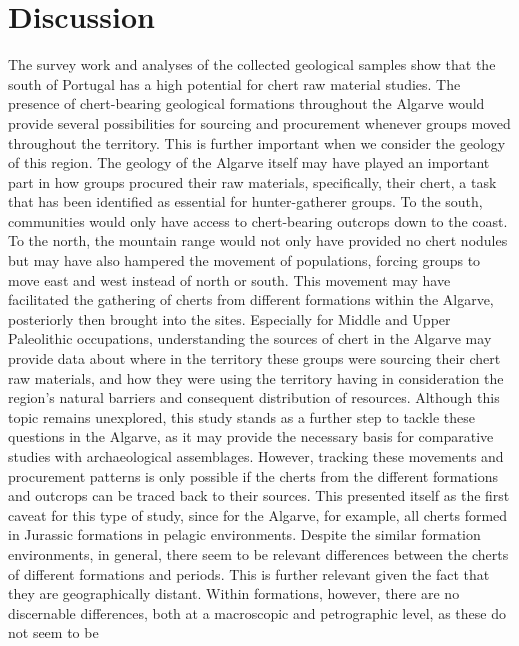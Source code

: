 \documentclass[
  a4paper,
  DIV=11,
  numbers=noendperiod]{scrreprt}
\begin{document}
\section*{Discussion}\label{discussion}


The survey work and analyses of the collected geological samples show
that the south of Portugal has a high potential for chert raw material
studies. The presence of chert-bearing geological formations throughout
the Algarve would provide several possibilities for sourcing and
procurement whenever groups moved throughout the territory. This is
further important when we consider the geology of this region. The
geology of the Algarve itself may have played an important part in how
groups procured their raw materials, specifically, their chert, a task
that has been identified as essential for hunter-gatherer groups. To the
south, communities would only have access to chert-bearing outcrops down
to the coast. To the north, the mountain range would not only have
provided no chert nodules but may have also hampered the movement of
populations, forcing groups to move east and west instead of north or
south. This movement may have facilitated the gathering of cherts from
different formations within the Algarve, posteriorly then brought into
the sites. Especially for Middle and Upper Paleolithic occupations,
understanding the sources of chert in the Algarve may provide data about
where in the territory these groups were sourcing their chert raw
materials, and how they were using the territory having in consideration
the region's natural barriers and consequent distribution of resources.
Although this topic remains unexplored, this study stands as a further
step to tackle these questions in the Algarve, as it may provide the
necessary basis for comparative studies with archaeological assemblages.
However, tracking these movements and procurement patterns is only
possible if the cherts from the different formations and outcrops can be
traced back to their sources. This presented itself as the first caveat
for this type of study, since for the Algarve, for example, all cherts
formed in Jurassic formations in pelagic environments. Despite the
similar formation environments, in general, there seem to be relevant
differences between the cherts of different formations and periods. This
is further relevant given the fact that they are geographically distant.
Within formations, however, there are no discernable differences, both
at a macroscopic and petrographic level, as these do not seem to be
\end{document}

